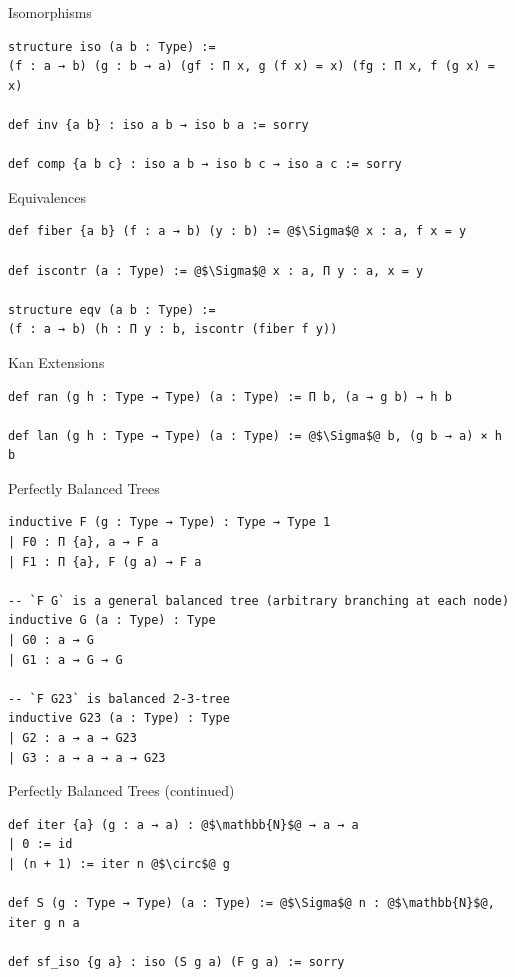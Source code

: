 \documentclass[pdf]{beamer}
\begin{document}
\begin{frame}[fragile]{Isomorphisms}
  \begin{verbatim}
structure iso (a b : Type) :=
(f : a → b) (g : b → a) (gf : Π x, g (f x) = x) (fg : Π x, f (g x) = x)

def inv {a b} : iso a b → iso b a := sorry

def comp {a b c} : iso a b → iso b c → iso a c := sorry
  \end{verbatim}
\end{frame}

\begin{frame}[fragile]{Equivalences}
  \begin{verbatim}
def fiber {a b} (f : a → b) (y : b) := @$\Sigma$@ x : a, f x = y

def iscontr (a : Type) := @$\Sigma$@ x : a, Π y : a, x = y

structure eqv (a b : Type) :=
(f : a → b) (h : Π y : b, iscontr (fiber f y))
  \end{verbatim}
\end{frame}

\begin{frame}[fragile]{Kan Extensions}
  \begin{verbatim}
def ran (g h : Type → Type) (a : Type) := Π b, (a → g b) → h b

def lan (g h : Type → Type) (a : Type) := @$\Sigma$@ b, (g b → a) × h b
  \end{verbatim}
\end{frame}

\begin{frame}[fragile]{Perfectly Balanced Trees}
  \begin{verbatim}
inductive F (g : Type → Type) : Type → Type 1
| F0 : Π {a}, a → F a
| F1 : Π {a}, F (g a) → F a

-- `F G` is a general balanced tree (arbitrary branching at each node)
inductive G (a : Type) : Type
| G0 : a → G
| G1 : a → G → G

-- `F G23` is balanced 2-3-tree
inductive G23 (a : Type) : Type
| G2 : a → a → G23
| G3 : a → a → a → G23
  \end{verbatim}
\end{frame}

\begin{frame}[fragile]{Perfectly Balanced Trees (continued)}
  \begin{verbatim}
def iter {a} (g : a → a) : @$\mathbb{N}$@ → a → a
| 0 := id
| (n + 1) := iter n @$\circ$@ g

def S (g : Type → Type) (a : Type) := @$\Sigma$@ n : @$\mathbb{N}$@, iter g n a

def sf_iso {g a} : iso (S g a) (F g a) := sorry
  \end{verbatim}
\end{frame}
\end{document}

